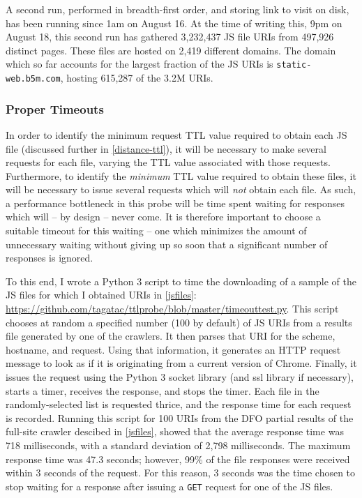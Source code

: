 A second run, performed in breadth-first order, and storing link to visit on disk, has been running since 1am on August 16.
At the time of writing this, 9pm on August 18, this second run has gathered 3,232,437 JS file URIs from 497,926 distinct pages.
These files are hosted on 2,419 different domains.
The domain which so far accounts for the largest fraction of the JS URIs is \texttt{static-web.b5m.com}, hosting 615,287 of the 3.2M URIs.
\subsubsection{Proper Timeouts}
In order to identify the minimum request TTL value required to obtain each JS file (discussed further in \autoref{distance-ttl}), it will be necessary to make several requests for each file, varying the TTL value associated with those requests.
Furthermore, to identify the \textit{minimum} TTL value required to obtain these files, it will be necessary to issue several requests which will \textit{not} obtain each file.
As such, a performance bottleneck in this probe will be time spent waiting for responses which will -- by design -- never come.
It is therefore important to choose a suitable timeout for this waiting -- one which minimizes the amount of unnecessary waiting without giving up so soon that a significant number of responses is ignored.

To this end, I wrote a Python 3 script to time the downloading of a sample of the JS files for which I obtained URIs in \autoref{jsfiles}: \url{https://github.com/tagatac/ttlprobe/blob/master/timeouttest.py}.
This script chooses at random a specified number (100 by default) of JS URIs from a results file generated by one of the crawlers.
It then parses that URI for the scheme, hostname, and request.
Using that information, it generates an HTTP request message to look as if it is originating from a current version of Chrome.
Finally, it issues the request using the Python 3 socket library (and ssl library if necessary), starts a timer, receives the response, and stops the timer.
Each file in the randomly-selected list is requested thrice, and the response time for each request is recorded.
Running this script for 100 URIs from the DFO partial results of the full-site crawler descibed in \autoref{jsfiles}, showed that the average response time was 718 milliseconds, with a standard deviation of 2,798 milliseconds.
The maximum response time was 47.3 seconds; however, 99\% of the file responses were received within 3 seconds of the request.
For this reason, 3 seconds was the time chosen to stop waiting for a response after issuing a \texttt{GET} request for one of the JS files.
